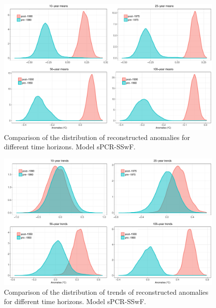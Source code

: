 \documentclass[11pt]{amsart}
\theoremstyle{plain}
\theoremstyle{definition}
\theoremstyle{remark}
\begin{document}
\begin{figure}[H]
  \centering
  \includegraphics[scale=0.35]{compMeans}
  \caption{Comparison of the distribution of reconstructed anomalies for different time horizons. Model sPCR-SSwF.}
  \label{fig:compmeans}
\end{figure}

\begin{figure}[H]
  \centering
  \includegraphics[scale=0.35]{compTrends}
  \caption{Comparison of the distribution of trends of reconstructed anomalies for different time horizons. Model sPCR-SSwF.}
  \label{fig:comptrends}
\end{figure}
\end{document}
